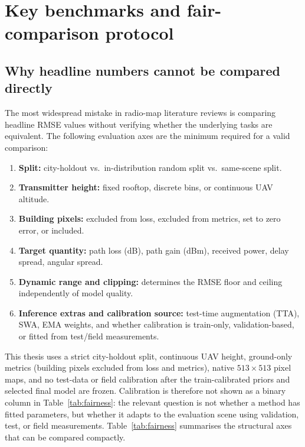 \section{Key benchmarks and fair-comparison protocol}
\label{sec:soa_benchmarks}

\subsection{Why headline numbers cannot be compared directly}

The most widespread mistake in radio-map literature reviews is comparing
headline RMSE values without verifying whether the underlying tasks are
equivalent.  The following evaluation axes are the minimum required for a
valid comparison:

\begin{enumerate}
  \item \textbf{Split:} city-holdout vs.\ in-distribution random split vs.\
        same-scene split.
  \item \textbf{Transmitter height:} fixed rooftop, discrete bins, or
        continuous UAV altitude.
  \item \textbf{Building pixels:} excluded from loss, excluded from metrics,
        set to zero error, or included.
  \item \textbf{Target quantity:} path loss (dB), path gain (dBm), received
        power, delay spread, angular spread.
  \item \textbf{Dynamic range and clipping:} determines the RMSE floor and
        ceiling independently of model quality.
  \item \textbf{Inference extras and calibration source:} test-time
        augmentation (TTA), SWA, EMA weights, and whether calibration is
        train-only, validation-based, or fitted from test/field measurements.
\end{enumerate}

This thesis uses a strict city-holdout split, continuous UAV height, ground-only
metrics (building pixels excluded from loss and metrics), native
$513 \times 513$ pixel maps, and no test-data or field calibration after the
train-calibrated priors and selected final model are frozen. Calibration is
therefore not shown as a binary column in Table~\ref{tab:fairness}: the relevant
question is not whether a method has fitted parameters, but whether it adapts
to the evaluation scene using validation, test, or field measurements.
Table~\ref{tab:fairness} summarises the structural axes that can be compared
compactly.

